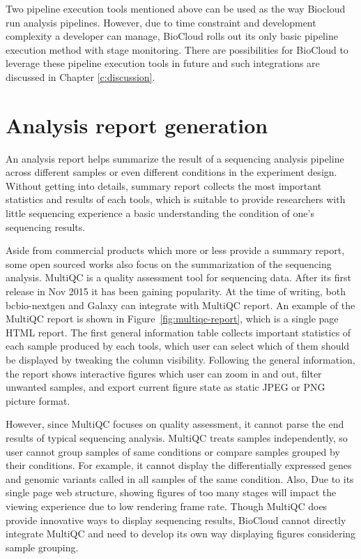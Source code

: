 Two pipeline execution tools mentioned above can be used as the way Biocloud
run analysis pipelines. However, due to time constraint and development
complexity a developer can manage, BioCloud rolls out its only basic pipeline
execution method with stage monitoring. There are possibilities for BioCloud to
leverage these pipeline execution tools in future and such integrations are
discussed in Chapter \ref{c:discussion}.


\section{Analysis report generation}

An analysis report helps summarize the result of a sequencing analysis pipeline
across different samples or even different conditions in the experiment design.
Without getting into details, summary report collects the most important
statistics and results of each tools, which is suitable to provide researchers
with little sequencing experience a basic understanding the condition of one's
sequencing results.

Aside from commercial products which more or less provide a summary report,
some open sourced works also focus on the summarization of the sequencing
analysis. MultiQC \cite{ewels2016:multiqc} is a quality assessment tool for
sequencing data. After its first release in Nov 2015 it has been gaining
popularity. At the time of writing, both bcbio-nextgen and Galaxy can integrate
with MultiQC report. An example of the MultiQC report is shown in
Figure~\ref{fig:multiqc-report}, which is a single page HTML report. The first
general information table collects important statistics of each sample produced
by each tools, which user can select which of them should be displayed by
tweaking the column visibility. Following the general information, the report
shows interactive figures which user can zoom in and out, filter unwanted
samples, and export current figure state as static JPEG or PNG picture format.

However, since MultiQC focuses on quality assessment, it cannot parse the end
results of typical sequencing analysis. MultiQC treats samples independently,
so user cannot group samples of same conditions or compare samples grouped by
their conditions. For example, it cannot display the differentially expressed
genes and genomic variants called in all samples of the same condition. Also,
Due to its single page web structure, showing figures of too many stages will
impact the viewing experience due to low rendering frame rate. Though MultiQC
does provide innovative ways to display sequencing results, BioCloud cannot
directly integrate MultiQC and need to develop its own way displaying figures
considering sample grouping.



